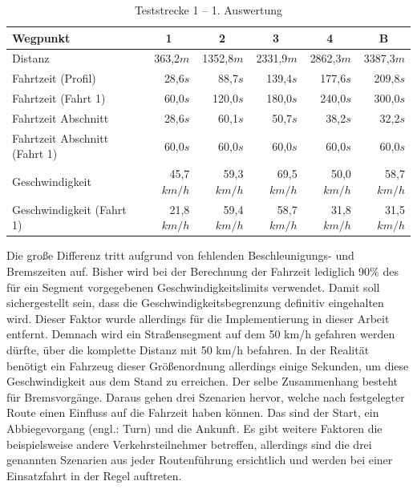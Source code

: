 \begin{table}[htb]
\centering
\small
\caption{Teststrecke 1 -- 1. Auswertung}
\label{tab:driveinit}
\begin{tabular}{|l|r|r|r|r|r|}
\hline
Wegpunkt                               & \multicolumn{1}{c|}{1} & \multicolumn{1}{c|}{2} & \multicolumn{1}{c|}{3} & \multicolumn{1}{c|}{4} & \multicolumn{1}{c|}{B}      \\ \hline
Distanz                                & 363,2$m$                & 1352,8$m$               & 2331,9$m$               & 2862,3$m$               & 3387,3$m$               \\ \hline
Fahrtzeit (Profil)                     & 28,6$s$                 & 88,7$s$                 & 139,4$s$                & 177,6$s$                & 209,8$s$                \\ \hline
Fahrtzeit (Fahrt 1)                  & 60,0$s$                 & 120,0$s$                & 180,0$s$                & 240,0$s$                & 300,0$s$                \\ \hline
Fahrtzeit Abschnitt                    & 28,6$s$                 & 60,1$s$                 & 50,7$s$                 & 38,2$s$                 & 32,2$s$                 \\ \hline
Fahrtzeit Abschnitt (Fahrt 1)        & 60,0$s$                 & 60,0$s$                 & 60,0$s$                 & 60,0$s$                 & 60,0$s$                 \\ \hline
Geschwindigkeit                        & 45,7$km/h$              & 59,3$km/h$              & 69,5$km/h$              & 50,0$km/h$              & 58,7$km/h$              \\ \hline
Geschwindigkeit (Fahrt 1)            & 21,8$km/h$              & 59,4$km/h$              & 58,7$km/h$              & 31,8$km/h$              & 31,5$km/h$              \\ \hline
\end{tabular}
\end{table}

Die große Differenz tritt aufgrund von fehlenden Beschleunigungs- und Bremszeiten auf.
Bisher wird bei der Berechnung der Fahrzeit lediglich 90$\%$ des für ein Segment vorgegebenen Geschwindigkeitslimits verwendet.
Damit soll sichergestellt sein, dass die Geschwindigkeitsbegrenzung definitiv eingehalten wird.
Dieser Faktor wurde allerdings für die Implementierung in dieser Arbeit entfernt.
Demnach wird ein Straßensegment auf dem 50 km/h gefahren werden dürfte, über die komplette Distanz mit 50 km/h befahren.
In der Realität benötigt ein Fahrzeug dieser Größenordnung allerdings einige Sekunden, um diese Geschwindigkeit aus dem Stand zu erreichen.
Der selbe Zusammenhang besteht für Bremsvorgänge.
Daraus gehen drei Szenarien hervor, welche nach festgelegter Route einen Einfluss auf die Fahrzeit haben können.
Das sind der Start, ein Abbiegevorgang (engl.: Turn) und die Ankunft.
Es gibt weitere Faktoren die beispielsweise andere Verkehrsteilnehmer betreffen, allerdings sind die drei genannten Szenarien aus jeder Routenführung ersichtlich und werden bei einer Einsatzfahrt in der Regel auftreten.

